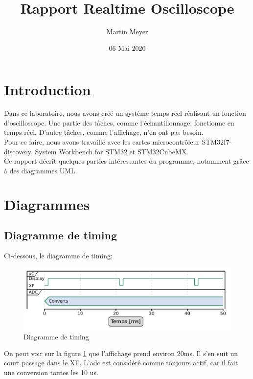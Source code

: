 \documentclass[12pt]{article}
\title{Rapport Realtime Oscilloscope}
\author{Martin Meyer}
\date{06 Mai 2020}
\begin{document}
	\maketitle
	
	\tableofcontents

	\section{Introduction}
	Dans ce laboratoire, nous avons créé un système temps réel réalisant un fonction d'oscilloscope. Une partie des tâches, comme l'échantillonnage, fonctionne en temps réel. D'autre tâches, comme l'affichage, n'en ont pas besoin.\\
	Pour ce faire, nous avons travaillé avec les cartes microcontrôleur STM32f7-discovery, System Workbench for STM32 et STM32CubeMX.\\
	Ce rapport décrit quelques parties intéressantes du programme, notamment grâce à des diagrammes UML.\newpage
	\section{Diagrammes}
	\subsection{Diagramme de timing}
	Ci-dessous, le diagramme de timing:
	\begin{figure}[H]
		\begin{center}
			\includegraphics[width=\columnwidth]{Ressources/timing.pdf}
			\caption{\label{timing} Diagramme de timing}
		\end{center}
	\end{figure}
	On peut voir sur la figure \ref{timing} que l'affichage prend environ 20ms. Il s'en suit un court passage dans le XF. L'adc est considéré comme toujours actif, car il fait une conversion toutes les 10 us.
\end{document}
